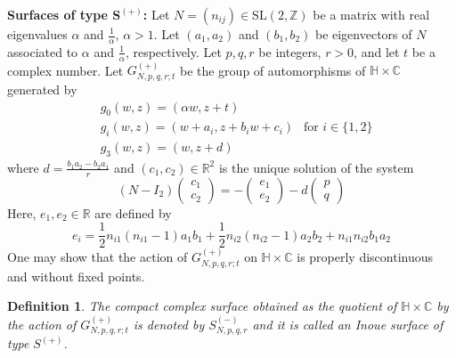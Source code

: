 \documentclass[12pt]{amsart}
\newtheorem{definition}{Definition}[section]
\newcommand{\R}{\mathbb{R}}
\newcommand{\Z}{\mathbb{Z}}
\newcommand{\C}{\mathbb{C}}
\newcommand{\HH}{\mathbb{H}}
\begin{document}
\noindent
{\bf Surfaces of type $\mathbf{S^{(+)}}$:} Let $N = (n_{ij}) \in \text{SL}(2,\Z)$ be a matrix with real eigenvalues $\alpha$ and $\frac{1}{\alpha}$, $\alpha > 1$. Let $(a_1,a_2)$ and $(b_1,b_2)$ be eigenvectors of $N$ associated to $\alpha$ and $\frac{1}{\alpha}$, respectively. Let $p,q,r$ be integers, $r>0$, and let $t$ be a complex number. Let $G^{(+)}_{N,p,q,r;t}$ be the group of automorphisms of $\HH\times \C$ generated by
\begin{equation}\label{Gp}
\begin{split}
&g_0(w,z) = (\alpha w,z+t)\\
&g_i(w,z) = (w + a_i, z+ b_iw+c_i)\ \ \text{ for }i\in\{1,2\}\\
&g_3(w,z) = (w, z+ d)
\end{split}
\end{equation}
where $d=\frac{b_1a_2-b_2a_1}{r}$ and $(c_1,c_2) \in \R^2$ is the unique solution of the system
\begin{equation}\label{InCon}
(N-I_2)\begin{pmatrix}
c_1\\
c_2
\end{pmatrix}=
-\begin{pmatrix}
e_1\\
e_2
\end{pmatrix}-d
\begin{pmatrix}
p\\
q
\end{pmatrix}
\end{equation}
Here, $e_1,e_2\in \R$ are defined by
$$
e_i = \frac{1}{2}n_{i1}(n_{i1}-1)a_1b_1 + \frac{1}{2}n_{i2}(n_{i2}-1)a_2b_2 + n_{i1}n_{i2}b_1a_2
$$
One may show that the action of $G_{N,p,q,r;t}^{(+)}$ on $\HH \times \C$ is properly discontinuous and without fixed points.

\begin{definition}
The compact complex surface obtained as the quotient of $\HH \times \C$ by the action of $G^{(+)}_{N,p,q,r;t}$ is denoted by $S^{(-)}_{N,p,q,r}$ and it is called an Inoue surface of type $S^{(+)}$.
\end{definition}
\end{document}
